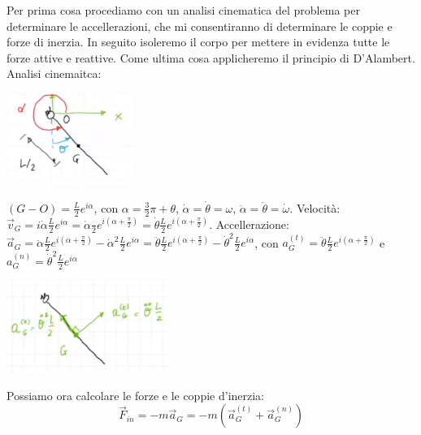 \newline
Per prima cosa procediamo con un analisi cinematica del problema per determinare le accellerazioni, che mi consentiranno di determinare le coppie e forze di inerzia.\newline
In seguito isoleremo il corpo per mettere in evidenza tutte le forze attive e reattive.\newline
Come ultima cosa applicheremo il principio di D'Alambert.\newline
\newline
Analisi cinemaitca:
\begin{center}
    \includegraphics[height=3cm]{../lezione9/img5.JPG}
\end{center}
 $(G-O) = \frac{L}{2}e^{i \alpha}$, con $\alpha = \frac{3}{2} \pi + \theta$, $\dot{\alpha} = \dot{\theta} = \omega$, $\ddot{\alpha} = \ddot{\theta} = \dot{\omega}$.\newline
Velocità: $\vec{v}_G = i \dot{\alpha} \frac{L}{2} e^{i \alpha} = \dot{\alpha} \frac{}{2} e^{i (\alpha + \frac{\pi}{2})} = \dot{\theta} \frac{L}{2} e^{i (\alpha + \frac{\pi}{2})}$.\newline
Accellerazione: $\vec{a}_G = \ddot{\alpha} \frac{L}{2} e^{i (\alpha + \frac{\pi}{2})} - \dot{\alpha}^2 \frac{L}{2} e^{i \alpha} = \ddot{\theta} \frac{L}{2} e^{i (\alpha + \frac{\pi}{2})} - \dot{\theta}^2 \frac{L}{2} e^{i \alpha}$, con $a^{(t)}_G = \ddot{\theta} \frac{L}{2} e^{i (\alpha + \frac{\pi}{2})}$ e $a^{(n)}_G = \dot{\theta}^2 \frac{L}{2} e^{i \alpha}$
\begin{center}
    \includegraphics[height=3cm]{../lezione9/img6.JPG}
\end{center}
Possiamo ora calcolare le forze e le coppie d'inerzia:
\[
    \vec{F}_{in} = - m \vec{a}_G = - m (\vec{a}_G^{(t)} + \vec{a}_G^{(n)})
\]
